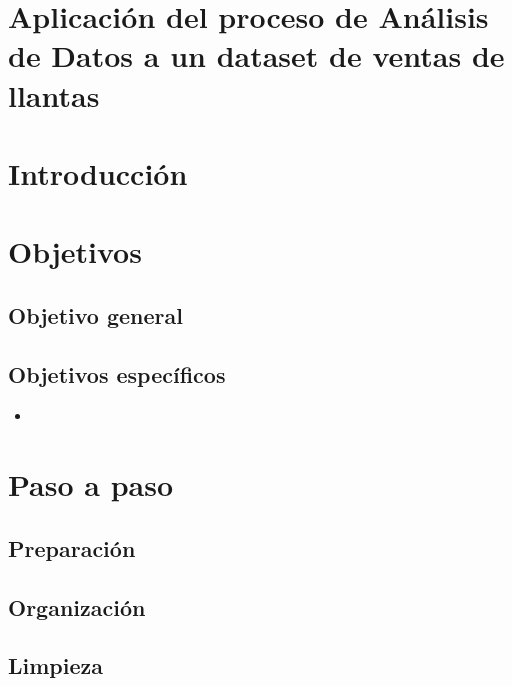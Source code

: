 \documentclass[12pt]{article}
\begin{document}
    

    \tableofcontents
    \newpage

    \section*{\centering Aplicación del proceso de Análisis de Datos a un dataset de ventas de llantas}

    \section{Introducción}
                

    \newpage
    \section{Objetivos}
        \subsection{Objetivo general}
                        

        \subsection{Objetivos específicos}
            \begin{itemize}
                \item 
            \end{itemize}


    \newpage
    \section{Paso a paso}
        \subsection{Preparación}
        \subsection{Organización}
        \subsection{Limpieza}
\end{document}
